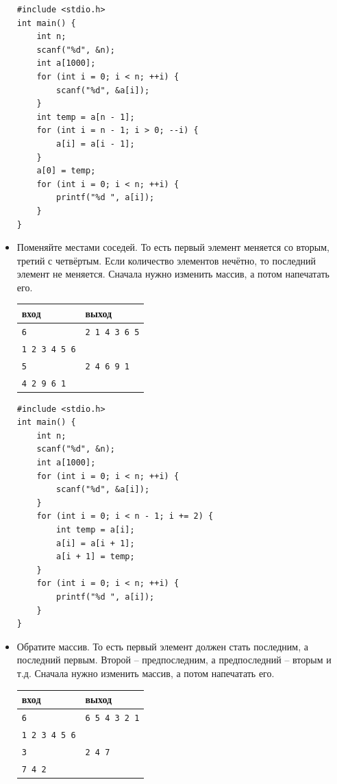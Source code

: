 \documentclass{article}
\begin{document}
\begin{itemize}
\begin{lstlisting}[backgroundcolor = \color{solcolor}]
#include <stdio.h>
int main() {
    int n;
    scanf("%d", &n);
    int a[1000];
    for (int i = 0; i < n; ++i) {
        scanf("%d", &a[i]);
    }
    int temp = a[n - 1];
    for (int i = n - 1; i > 0; --i) {
        a[i] = a[i - 1];
    }
    a[0] = temp;
    for (int i = 0; i < n; ++i) {
        printf("%d ", a[i]);
    }
}
\end{lstlisting}

\item Поменяйте местами соседей. То есть первый элемент меняется со вторым, третий с четвёртым. Если количество элементов нечётно, то последний элемент не меняется. Сначала нужно изменить массив, а потом напечатать его.
\begin{center}
\begin{tabular}{ l | l }
 вход & выход \\ \hline
 \texttt{6} & \texttt{2 1 4 3 6 5}  \\ 
 \texttt{1 2 3 4 5 6} &   \\ \hline
 \texttt{5} & \texttt{2 4 6 9 1}  \\ 
 \texttt{4 2 9 6 1} &   \\
\end{tabular}
\end{center}
\begin{lstlisting}[backgroundcolor = \color{solcolor}]
#include <stdio.h>
int main() {
    int n;
    scanf("%d", &n);
    int a[1000];
    for (int i = 0; i < n; ++i) {
        scanf("%d", &a[i]);
    }
    for (int i = 0; i < n - 1; i += 2) {
        int temp = a[i];
        a[i] = a[i + 1];
        a[i + 1] = temp;
    }
    for (int i = 0; i < n; ++i) {
        printf("%d ", a[i]);
    }
}
\end{lstlisting}


\item Обратите массив. То есть первый элемент должен стать последним, а последний первым. Второй -- предпоследним, а предпоследний -- вторым и т.д. Сначала нужно изменить массив, а потом напечатать его.
\begin{center}
\begin{tabular}{ l | l }
 вход & выход \\ \hline
 \texttt{6} & \texttt{6 5 4 3 2 1}  \\ 
 \texttt{1 2 3 4 5 6} &   \\ \hline
 \texttt{3} & \texttt{2 4 7}  \\ 
 \texttt{7 4 2} &   \\
\end{tabular}
\end{center}


\end{itemize}
\end{document}
